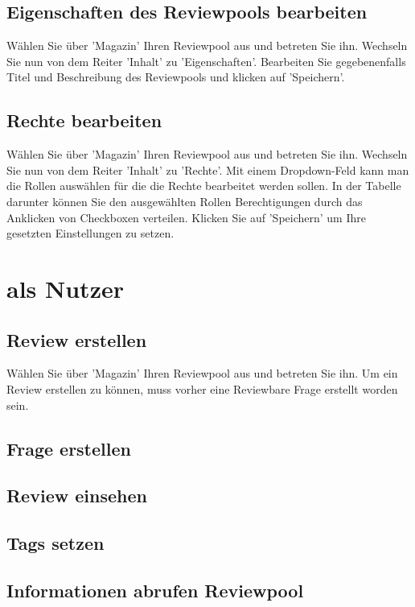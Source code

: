 \documentclass[12pt,a4paper]{scrreprt}
\begin{document}
		\subsection{Eigenschaften des Reviewpools bearbeiten}
		Wählen Sie über 'Magazin' Ihren Reviewpool aus und betreten Sie ihn. Wechseln Sie nun von dem Reiter 'Inhalt' zu 'Eigenschaften'. Bearbeiten Sie gegebenenfalls Titel und Beschreibung des Reviewpools und klicken auf 'Speichern'. 
		\subsection{Rechte bearbeiten}
		Wählen Sie über 'Magazin' Ihren Reviewpool aus und betreten Sie ihn. Wechseln Sie nun von dem Reiter 'Inhalt' zu 'Rechte'. Mit einem Dropdown-Feld kann man die Rollen auswählen für die die Rechte bearbeitet werden sollen. In der Tabelle darunter können Sie den ausgewählten Rollen Berechtigungen durch das Anklicken von Checkboxen verteilen. Klicken Sie auf 'Speichern' um Ihre gesetzten Einstellungen zu setzen. 
	\section{als Nutzer}
		\subsection{Review erstellen}
		Wählen Sie über 'Magazin' Ihren Reviewpool aus und betreten Sie ihn. Um ein Review erstellen zu können, muss vorher eine Reviewbare Frage erstellt worden sein.
		
		\subsection{Frage erstellen}
		\subsection{Review einsehen}
		\subsection{Tags setzen}
		\subsection{Informationen abrufen Reviewpool}
\end{document}
